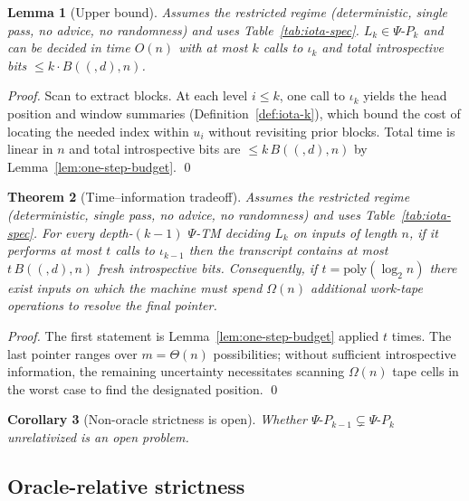 \documentclass[11pt]{article}
\let\oldlog\log
\renewcommand{\log}{\oldlog_2}
\newtheorem{theorem}{Theorem}[section]
\newtheorem{lemma}[theorem]{Lemma}
\newtheorem{corollary}[theorem]{Corollary}
\theoremstyle{plain}
\theoremstyle{definition}
\newcommand{\B}[2]{B(#1,#2)}  %
\begin{document}
\begin{lemma}[Upper bound]
\label{lem:Lk-upper}
Assumes the restricted regime (deterministic, single pass, no advice, no randomness) and uses Table~\ref{tab:iota-spec}.
$L_k\in \Psi\text{-}P_k$ and can be decided in time $O(n)$ with at most $k$ calls to $\iota_k$ and total introspective bits $\le k\cdot \B(d,n)$.
\end{lemma}
\begin{proof}
Scan to extract blocks. At each level $i\le k$, one call to $\iota_k$ yields the head position and window summaries (Definition~\ref{def:iota-k}), which bound the cost of locating the needed index within $u_i$ without revisiting prior blocks. Total time is linear in $n$ and total introspective bits are $\le k\,\B(d,n)$ by Lemma~\ref{lem:one-step-budget}. \qed
\end{proof}

\begin{theorem}[Time--information tradeoff]
\label{thm:tradeoff}
Assumes the restricted regime (deterministic, single pass, no advice, no randomness) and uses Table~\ref{tab:iota-spec}.
For every depth-$(k{-}1)$ $\Psi$-TM deciding $L_k$ on inputs of length $n$, if it performs at most $t$ calls to $\iota_{k-1}$ then the transcript contains at most $t\,\B(d,n)$ fresh introspective bits. Consequently, if $t=\mathrm{poly}(\log n)$ there exist inputs on which the machine must spend $\Omega(n)$ additional work-tape operations to resolve the final pointer.
\end{theorem}
\begin{proof}
The first statement is Lemma~\ref{lem:one-step-budget} applied $t$ times. The last pointer ranges over $m=\Theta(n)$ possibilities; without sufficient introspective information, the remaining uncertainty necessitates scanning $\Omega(n)$ tape cells in the worst case to find the designated position. \qed
\end{proof}

\begin{corollary}[Non-oracle strictness is open]
\label{cor:strictness-open}
Whether $\Psi\text{-}P_{k-1}\subsetneq \Psi\text{-}P_k$ unrelativized is an open problem.
\end{corollary}

\subsection{Oracle-relative strictness}
\label{sec:oracle-strictness}
\end{document}
